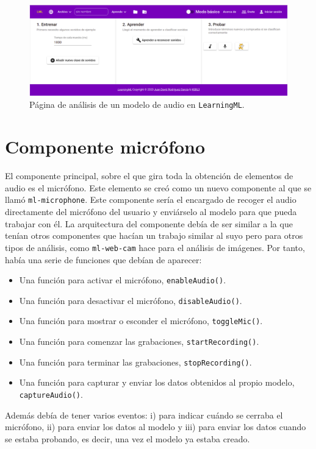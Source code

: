 \documentclass[a4paper, 12pt]{book}
\begin{document}
\begin{figure}
	\centering
	\includegraphics[width=12cm, keepaspectratio]{img/audio-model.png}
	\caption{Página de análisis de un modelo de audio en \texttt{LearningML}.}\label{fig:audio-page}
\end{figure}

\section{Componente micrófono}
\label{sec:mic}

El componente principal, sobre el que gira toda la obtención de elementos de audio es el micrófono. Este elemento se creó como un nuevo componente al que se llamó \texttt{ml-microphone}. Este componente sería el encargado de recoger el audio directamente del micrófono del usuario y enviárselo al modelo para que pueda trabajar con él. La arquitectura del componente debía de ser similar a la que tenían otros componentes que hacían un trabajo similar al suyo pero para otros tipos de análisis, como \texttt{ml-web-cam} hace para el análisis de imágenes. Por tanto, había una serie de funciones que debían de aparecer:
\begin{itemize}
	\item Una función para activar el micrófono, \texttt{enableAudio()}.
	\item Una función para desactivar el micrófono, \texttt{disableAudio()}.
	\item Una función para mostrar o esconder el micrófono, \texttt{toggleMic()}.
	\item Una función para comenzar las grabaciones, \texttt{startRecording()}.
	\item Una función para terminar las grabaciones, \texttt{stopRecording()}.
	\item Una función para capturar y enviar los datos obtenidos al propio modelo, \texttt{captureAudio()}.
\end{itemize}

Además debía de tener varios eventos: i) para indicar cuándo se cerraba el micrófono, ii) para enviar los datos al modelo y iii) para enviar los datos cuando se estaba probando, es decir, una vez el modelo ya estaba creado.
\end{document}
